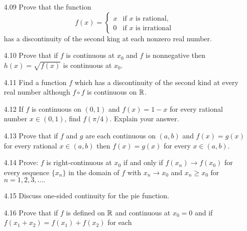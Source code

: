 \begin{enumerate}
   \item[4.09] Prove that the function
               \begin{equation*}
                  f(x) = \begin{cases}
                     x  & \text{if $x$ is rational}, \\
                     0  & \text{if $x$ is irrational}
                  \end{cases}
               \end{equation*}
               has a discontinuity of the second king at each nonzero real
               number.
   \item[4.10] Prove that if $f$ is continuous at $x_0$ and $f$ is nonnegative
               then $h(x) = \sqrt{f(x)}$ is continuous at $x_0$.
   \item[4.11] Find a function $f$ which has a discontinuity of the second kind
               at every real number although $f \circ f$ is continuous on $\mathbb{R}$.
   \item[4.12] If $f$ is continuous on $(0, 1)$ and $f(x) = 1 - x$ for every
               rational number $x \in (0, 1)$, find $f(\pi/4)$. Explain your
               answer.
   \item[4.13] Prove that if $f$ and $g$ are each continuous on $(a, b)$ and
               $f(x) = g(x)$ for every rational $x \in (a, b)$ then
               $f(x) = g(x)$ for every $x \in (a, b)$.
   \item[4.14] Prove: $f$ is right-continuous at $x_0$ if and only if
               $f(x_n) \rightarrow f(x_0)$ for every sequence $\{x_n\}$ in the
               domain of $f$ with $x_n \rightarrow x_0$ and $x_n \ge x_0$ for
               $n = 1, 2, 3, ....$
   \item[4.15] Discuss one-sided continuity for the pie function.
   \item[4.16] Prove that if $f$ is defined on $\mathbb{R}$ and continuous at $x_0 = 0$
               and if $f(x_1 + x_2) = f(x_1) + f(x_2)$ for each

\end{enumerate}
